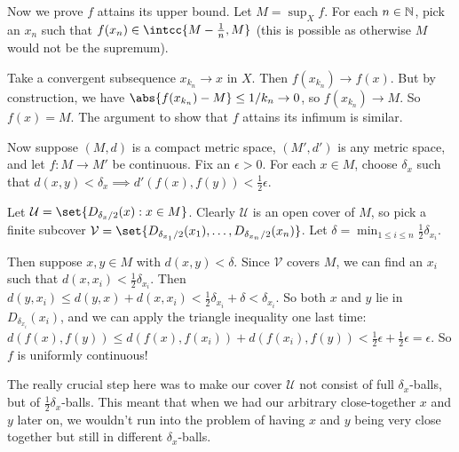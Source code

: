 \documentclass[a4paper,12pt,fleqn]{article}
\begin{document}
\begin{enumerate}[label=\arabic*.,leftmargin=*]
  Now we prove \(f\) attains its upper bound. Let \(M = \sup_X f\).
  For each \(n \in \mathbb N\), pick an \(x_n\) such that
  \(f(x_n) \in \intcc{M - \tfrac 1n, M}\) (this is possible as otherwise \(M\)
  would not be the supremum).

  Take a convergent subsequence \(x_{k_n} \to x\) in \(X\).
  Then \(f(x_{k_n}) \to f(x)\). But by construction, we have
  \(\abs{f(x_{k_n}) - M} \le 1/k_n \to 0\), so \(f(x_{k_n}) \to M\).
  So \(f(x) = M\). The argument to show that \(f\) attains its infimum is
  similar.

  Now suppose \((M, d)\) is a compact metric space, \((M', d')\) is any metric
  space, and let \(f: M \to M'\) be continuous. Fix an \(\epsilon > 0\). For
  each \(x \in M\), choose \(\delta_x\) such that
  \(d(x, y) < \delta_x \implies d'(f(x), f(y)) < \tfrac 12 \epsilon\).

  Let \(\mathcal U = \set{D_{\delta_x / 2}(x) : x \in M}\). Clearly
  \(\mathcal U\) is an open cover of \(M\), so pick a finite subcover
  \(\mathcal V
    = \set{D_{\delta_{x_1} / 2}(x_1), \dotsc, D_{\delta_{x_n} / 2}(x_n)}\).
  Let \(\delta = \min_{1 \le i \le n} \tfrac 12 \delta_{x_i}\).

  Then suppose \(x, y \in M\) with \(d(x, y) < \delta\).
  Since \(\mathcal V\) covers \(M\), we can find an \(x_i\) such that
  \(d(x, x_i) < \tfrac 12 \delta_{x_i}\). Then
  \(d(y, x_i)
    \le d(y, x) + d(x, x_i)
    < \tfrac 12 \delta_{x_i} + \delta
    < \delta_{x_i}\).
  So both \(x\) and \(y\) lie in \(D_{\delta_{x_i}}(x_i)\), and we can apply the
  triangle inequality one last time:
  \(d(f(x), f(y))
    \le d(f(x), f(x_i)) + d(f(x_i), f(y))
    < \tfrac 12 \epsilon + \tfrac 12 \epsilon
    = \epsilon\).
  So \(f\) is uniformly continuous!
  \begin{remark}
   The really crucial step here was to make our cover \(\mathcal U\) not consist
   of full \(\delta_x\)-balls, but of \(\tfrac 12 \delta_x\)-balls. This meant
   that when we had our arbitrary close-together \(x\) and \(y\) later on, we
   wouldn't run into the problem of having \(x\) and \(y\) being very close
   together but still in different \(\delta_x\)-balls.


\end{remark}
\end{enumerate}
\end{document}
